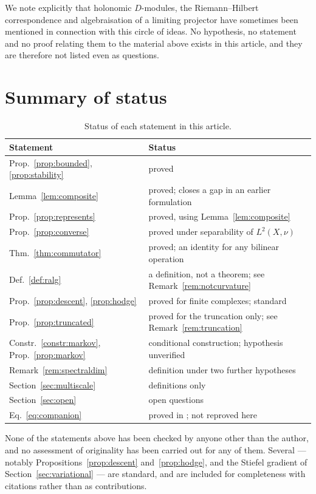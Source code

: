 \documentclass[11pt]{amsart}
\theoremstyle{definition}
\theoremstyle{remark}
\begin{document}
We note explicitly that holonomic $D$-modules, the Riemann--Hilbert correspondence and
algebraisation of a limiting projector have sometimes been mentioned in connection with
this circle of ideas. No hypothesis, no statement and no proof relating them to the
material above exists in this article, and they are therefore not listed even as
questions.

\section{Summary of status}
\label{sec:status}

\begin{table}[h]
\centering\small
\caption{Status of each statement in this article.}
\label{tab:status}
\begin{tabularx}{\linewidth}{@{}lX@{}}
\toprule
Statement & Status \\
\midrule
Prop.~\ref{prop:bounded}, \ref{prop:stability} & proved \\
Lemma~\ref{lem:composite} & proved; closes a gap in an earlier formulation \\
Prop.~\ref{prop:represents} & proved, using Lemma~\ref{lem:composite} \\
Prop.~\ref{prop:converse} & proved under separability of $L^{2}(X,\nu)$ \\
Thm.~\ref{thm:commutator} & proved; an identity for any bilinear operation \\
Def.~\ref{def:ralg} & a definition, not a theorem; see Remark~\ref{rem:notcurvature} \\
Prop.~\ref{prop:descent}, \ref{prop:hodge} & proved for finite complexes; standard \\
Prop.~\ref{prop:truncated} & proved for the truncation only; see Remark~\ref{rem:truncation} \\
Constr.~\ref{constr:markov}, Prop.~\ref{prop:markov} & conditional construction; hypothesis unverified \\
Remark~\ref{rem:spectraldim} & definition under two further hypotheses \\
Section~\ref{sec:multiscale} & definitions only \\
Section~\ref{sec:open} & open questions \\
Eq.~\eqref{eq:companion} & proved in \cite{ChaveroJassoTrees}; not reproved here \\
\bottomrule
\end{tabularx}
\end{table}

None of the statements above has been checked by anyone other than the author, and no
assessment of originality has been carried out for any of them. Several --- notably
Propositions~\ref{prop:descent} and~\ref{prop:hodge}, and the Stiefel gradient of
Section~\ref{sec:variational} --- are standard, and are included for completeness with
citations rather than as contributions.



\end{document}

